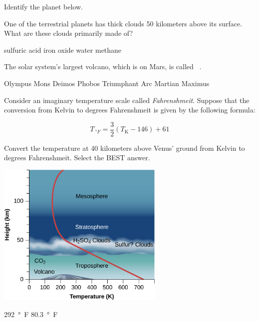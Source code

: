 \documentclass{exam}
\begin{document}
\begin{questions}
\question
Identify the planet below.

\begin{center}
\end{center}

\question
One of the terrestrial planets has thick clouds 50 kilometers above its surface. What are these clouds primarily made of?

\begin{randomizechoices}
    \correctchoice sulfuric acid
    \choice iron oxide
    \choice water
    \choice methane
\end{randomizechoices}

\question
The solar system's largest volcano, which is on Mars, is called \fillin\ .

\begin{randomizechoices}
    \correctchoice Olympus Mons
    \choice Deimos
    \choice Phobos
    \choice Triumphant Arc
    \choice Martian Maximus
\end{randomizechoices}

\question
Consider an imaginary temperature scale called \textit{Fahrenshmeit}. Suppose that the conversion from Kelvin to degrees Fahrenshmeit is given by the following formula:

\begin{equation*}
    T_{\SI{}{\degree F}} = \frac{3}{2} \left(T_{\text{K}} - 146\right) + 61
\end{equation*}

Convert the temperature at 40 kilometers above Venus' ground from Kelvin to degrees Fahrenshmeit. Select the BEST answer.

\begin{center}
    \includegraphics[width=8cm]{Figures/Figure10.12.jpeg}
\end{center}

\begin{randomizechoices}
    \correctchoice \SI{292}{\degree F}
    \choice \SI{80.3}{\degree F}
\end{randomizechoices}

\end{questions}
\end{document}
